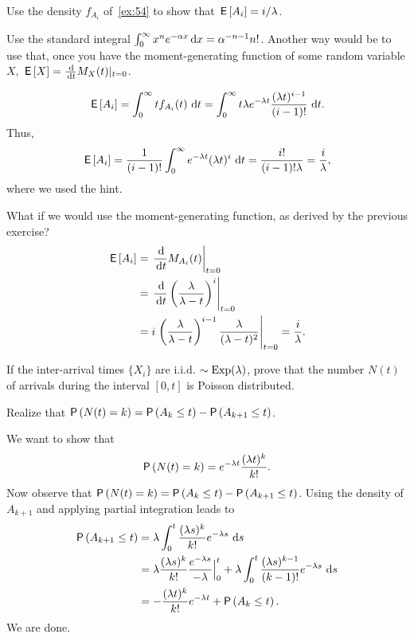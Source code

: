 \documentclass[companion]{subfiles}
\begin{document}
\begin{extra}
 Use the density $f_{A_i}$ of~\cref{ex:54} to show that $\,\mathsf{E}\left[A_i\right]=i/\lambda$. 
\begin{hint}
Use the standard integral 
 $\int_0^\infty x^n e^{-\alpha x} \,\text{d}x =
 \alpha^{-n-1}n!$. 
 Another way would be to use that, once you have the moment-generating function of some random variable $X$,
 $\E X = \frac{\d}{\d t} M_X(t) |_{t=0}$. 
\end{hint}
\begin{solution}
 \begin{equation*}
\,\mathsf{E}\left[A_i\right] = \int_0^\infty t f_{A_i} (t) \, \,\text{d}t = 
\int_0^\infty t \lambda e^{-\lambda t} \frac{(\lambda t)^{i-1}}{(i-1)!}\, \,\text{d}t.
 \end{equation*}
Thus, 
 \begin{equation*}
\,\mathsf{E}\left[A_i\right] = \frac{1}{(i-1)!} \int_0^\infty e^{-\lambda t} (\lambda t)^i\,\,\text{d}t = \frac{i!}{(i-1)!\lambda}=\frac{i}\lambda,
 \end{equation*}
 where we used the hint.

What if we would use the moment-generating function, as derived by the previous exercise?
\begin{align*}
 \E{A_i} 
&= \left.\frac{\d}{\d t} M_{A_i}(t)\right|_{t=0} \\
&= \left.\frac{\d}{\d t} \left(\frac{\lambda}{\lambda-t}\right)^i\right|_{t=0} \\
&= i \left.\left(\frac{\lambda}{\lambda-t}\right)^{i-1}\frac{\lambda}{(\lambda-t)^2}\right|_{t=0} 
= \frac i\lambda.
\end{align*}


\end{solution}
\end{extra}

\begin{exercise}
 If the inter-arrival times $\{X_i\}$ are i.i.d.
 $\sim \operatorname{Exp}(\lambda)$, prove that the number $N(t)$ of arrivals during the interval $[0,t]$ is Poisson distributed.
\begin{hint}
 Realize that
 $\P{N(t)=k} = \P{A_k \leq t} - \P{A_{k+1} \leq t}$.
\end{hint}
\begin{solution}
 We want to show that
 \begin{equation*}
 \P{N(t)=k} = e^{-\lambda t}\frac{(\lambda t)^k}{k!}.
 \end{equation*}
 Now observe that $\P{N(t)=k} = \P{A_k \leq t} - \P{A_{k+1} \leq t}$.
 Using the density of $A_{k+1}$ and applying partial integration leads to
\begin{align*}
\P{A_{k+1} \leq t} 
&= \lambda \int_0^t \frac{(\lambda s)^{k}}{k!}e^{-\lambda s}\, \d s \\
&= \lambda \frac{(\lambda s)^{k}}{k!}\frac{e^{-\lambda s}}{-\lambda} \Big|_{0}^t + \lambda \int_0^t \frac{(\lambda s)^{k-1}}{(k-1)!}e^{-\lambda s}\, \d s \\
&= - \frac{(\lambda t)^{k}}{k!} e^{-\lambda t} + \P{A_k \leq t}.
\end{align*}
We are done.
\end{solution}
\end{exercise}
\end{document}
